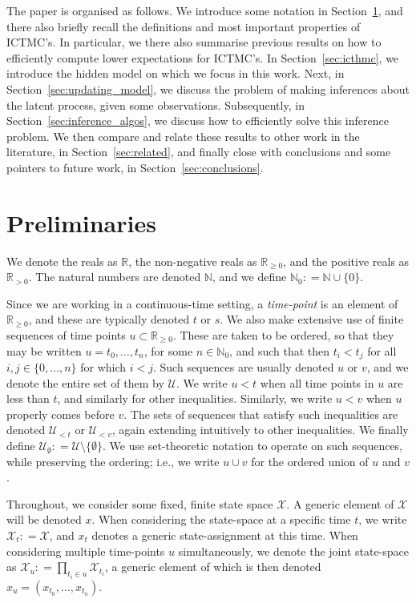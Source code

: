 \documentclass[twoside,11pt]{article}
\newcommand{\nats}{\mathbb{N}}
\newcommand{\natswith}{\nats_{0}}
\newcommand{\reals}{\mathbb{R}}
\newcommand{\realspos}{\reals_{>0}}
\newcommand{\realsnonneg}{\reals_{\geq 0}}
\newcommand{\states}{\mathcal{X}}
\newcommand{\coloneqq}{:\!=}
\begin{document}
The paper is organised as follows. We introduce some notation in Section~\ref{sec:prelim}, and there also briefly recall the definitions and most important properties of ICTMC's. In particular, we there also summarise previous results on how to efficiently compute lower expectations for ICTMC's. In Section~\ref{sec:icthmc}, we introduce the hidden model on which we focus in this work. Next, in Section~\ref{sec:updating_model}, we discuss the problem of making inferences about the latent process, given some observations. Subsequently, in Section~\ref{sec:inference_algos}, we discuss how to efficiently solve this inference problem. We then compare and relate these results to other work in the literature, in Section~\ref{sec:related}, and finally close with conclusions and some pointers to future work, in Section~\ref{sec:conclusions}.

\section{Preliminaries}\label{sec:prelim}

We denote the reals as $\reals$, the non-negative reals as $\realsnonneg$, and the positive reals as $\realspos$. The natural numbers are denoted $\nats$, and we define $\natswith\coloneqq\nats\cup\{0\}$.

Since we are working in a continuous-time setting, a \emph{time-point} is an element of $\realsnonneg$, and these are typically denoted $t$ or $s$. We also make extensive use of finite sequences of time points $u\subset\realsnonneg$. These are taken to be ordered, so that they may be written $u=t_0,\ldots,t_n$, for some $n\in\natswith$, and such that then $t_i<t_j$ for all $i,j\in\{0,\ldots,n\}$ for which $i< j$. Such sequences are usually denoted $u$ or $v$, and we denote the entire set of them by $\mathcal{U}$. We write $u<t$ when all time points in $u$ are less than $t$, and similarly for other inequalities. Similarly, we write $u<v$ when $u$ properly comes before $v$. The sets of sequences that satisfy such inequalities are denoted $\mathcal{U}_{<t}$ or $\mathcal{U}_{<v}$, again extending intuitively to other inequalities. We finally define $\mathcal{U}_\emptyset\coloneqq \mathcal{U}\setminus\{\emptyset\}$. We use set-theoretic notation to operate on such sequences, while preserving the ordering; i.e., we write $u\cup v$ for the ordered union of $u$ and $v$.

Throughout, we consider some fixed, finite state space $\states$. A generic element of $\states$ will be denoted $x$. When considering the state-space at a specific time $t$, we write $\states_t\coloneqq\states$, and $x_t$ denotes a generic state-assignment at this time. When considering multiple time-points $u$ simultaneously, we denote the joint state-space as $\states_u\coloneqq\prod_{t_i\in u}\states_{t_i}$, a generic element of which is then denoted $x_u=(x_{t_0},\ldots,x_{t_n})$.
\end{document}
